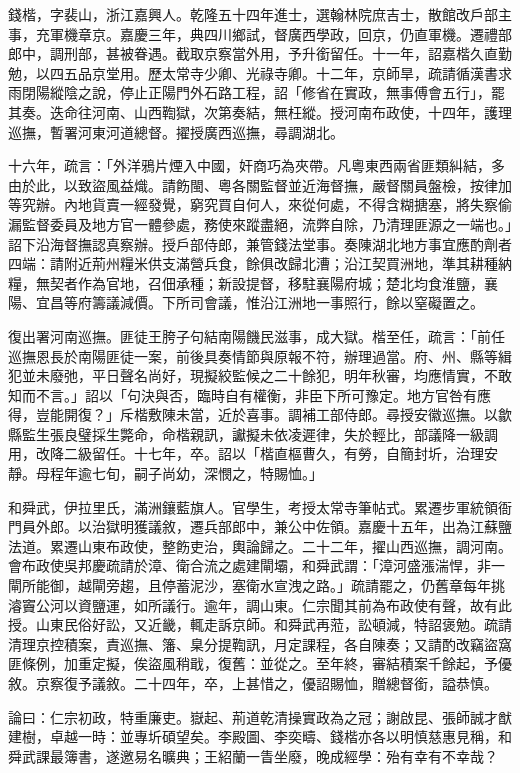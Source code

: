 \begin{pinyinscope}
錢楷，字裴山，浙江嘉興人。乾隆五十四年進士，選翰林院庶吉士，散館改戶部主事，充軍機章京。嘉慶三年，典四川鄉試，督廣西學政，回京，仍直軍機。遷禮部郎中，調刑部，甚被眷遇。截取京察當外用，予升銜留任。十一年，詔嘉楷久直勤勉，以四五品京堂用。歷太常寺少卿、光祿寺卿。十二年，京師旱，疏請循漢書求雨閉陽縱陰之說，停止正陽門外石路工程，詔「修省在實政，無事傅會五行」，罷其奏。迭命往河南、山西鞫獄，次第奏結，無枉縱。授河南布政使，十四年，護理巡撫，暫署河東河道總督。擢授廣西巡撫，尋調湖北。

十六年，疏言：「外洋鴉片煙入中國，奸商巧為夾帶。凡粵東西兩省匪類糾結，多由於此，以致盜風益熾。請飭閩、粵各關監督並近海督撫，嚴督關員盤檢，按律加等究辦。內地貨賣一經發覺，窮究買自何人，來從何處，不得含糊搪塞，將失察偷漏監督委員及地方官一體參處，務使來蹤盡絕，流弊自除，乃清理匪源之一端也。」詔下沿海督撫認真察辦。授戶部侍郎，兼管錢法堂事。奏陳湖北地方事宜應酌劑者四端：請附近荊州糧米供支滿營兵食，餘俱改歸北漕；沿江契買洲地，準其耕種納糧，無契者作為官地，召佃承種；新設提督，移駐襄陽府城；楚北均食淮鹽，襄陽、宜昌等府籌議減價。下所司會議，惟沿江洲地一事照行，餘以窒礙置之。

復出署河南巡撫。匪徒王胯子句結南陽饑民滋事，成大獄。楷至任，疏言：「前任巡撫恩長於南陽匪徒一案，前後具奏情節與原報不符，辦理過當。府、州、縣等緝犯並未廢弛，平日聲名尚好，現擬絞監候之二十餘犯，明年秋審，均應情實，不敢知而不言。」詔以「句決與否，臨時自有權衡，非臣下所可豫定。地方官咎有應得，豈能開復？」斥楷敷陳未當，近於喜事。調補工部侍郎。尋授安徽巡撫。以歙縣監生張良璧採生斃命，命楷親訊，讞擬未依凌遲律，失於輕比，部議降一級調用，改降二級留任。十七年，卒。詔以「楷直樞曹久，有勞，自簡封圻，治理安靜。母程年逾七旬，嗣子尚幼，深憫之，特賜恤。」

和舜武，伊拉里氏，滿洲鑲藍旗人。官學生，考授太常寺筆帖式。累遷步軍統領衙門員外郎。以治獄明獲議敘，遷兵部郎中，兼公中佐領。嘉慶十五年，出為江蘇鹽法道。累遷山東布政使，整飭吏治，輿論歸之。二十二年，擢山西巡撫，調河南。會布政使吳邦慶疏請於漳、衛合流之處建閘壩，和舜武謂：「漳河盛漲湍悍，非一閘所能御，越閘旁趨，且停蓄泥沙，塞衛水宣洩之路。」疏請罷之，仍舊章每年挑濬竇公河以資鹽運，如所議行。逾年，調山東。仁宗聞其前為布政使有聲，故有此授。山東民俗好訟，又近畿，輒走訴京師。和舜武再蒞，訟頓減，特詔褒勉。疏請清理京控積案，責巡撫、籓、臬分提鞫訊，月定課程，各自陳奏；又請酌改竊盜窩匪條例，加重定擬，俟盜風稍戢，復舊：並從之。至年終，審結積案千餘起，予優敘。京察復予議敘。二十四年，卒，上甚惜之，優詔賜恤，贈總督銜，謚恭慎。

論曰：仁宗初政，特重廉吏。嶽起、荊道乾清操實政為之冠；謝啟昆、張師誠才猷建樹，卓越一時：並專圻碩望矣。李殿圖、李奕疇、錢楷亦各以明慎慈惠見稱，和舜武課最簿書，遂邀易名曠典；王紹蘭一眚坐廢，晚成經學：殆有幸有不幸哉？


\end{pinyinscope}